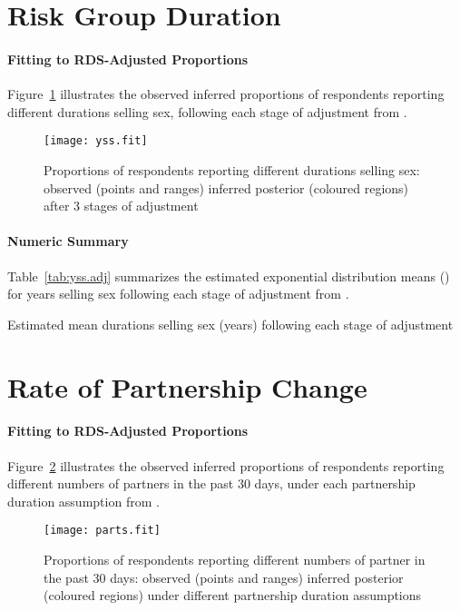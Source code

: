 \section{Risk Group Duration}\label{app.yss}
\paragraph{Fitting to RDS-Adjusted Proportions}
Figure~\ref{fig:yss.fit} illustrates
the observed \vs inferred proportions of respondents reporting
different durations selling sex,
following each stage of adjustment from .
\begin{figure}[h]
  \centering\texttt{[image: yss.fit]}
  \caption{Proportions of respondents reporting different durations selling sex:
    observed (points and ranges) \vs inferred posterior (coloured regions)
    after 3 stages of adjustment}
  \label{fig:yss.fit}
\end{figure}
\paragraph{Numeric Summary}
Table~\ref{tab:yss.adj} summarizes the estimated exponential distribution means (\ci)
for years selling sex following each stage of adjustment from .
\begin{table}[h]
  \centering
  \caption{Estimated mean durations selling sex (years) following each stage of adjustment}
  \label{tab:yss.adj}
  
\end{table}
\section{Rate of Partnership Change}\label{app.parts}
\paragraph{Fitting to RDS-Adjusted Proportions}
Figure~\ref{fig:parts.fit} illustrates
the observed \vs inferred proportions of respondents reporting
different numbers of partners in the past 30 days,
under each partnership duration assumption from .
\begin{figure}[h]
  \centering\texttt{[image: parts.fit]}
  \caption{Proportions of respondents reporting different numbers of partner in the past 30 days:
    observed (points and ranges) \vs inferred posterior (coloured regions)
    under different partnership duration assumptions}
  \label{fig:parts.fit}
\end{figure}
